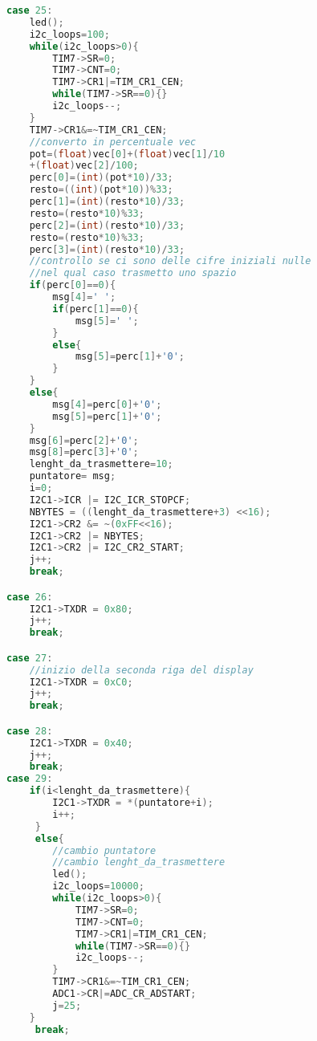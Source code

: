 \documentclass[main.tex]{subfiles}
\begin{document}
\begin{lstlisting}[language=C,caption=Trasmissione messaggio manopola,label={lst:trasm_vec}]
case 25:
	led();
	i2c_loops=100;
	while(i2c_loops>0){
		TIM7->SR=0;
		TIM7->CNT=0;
		TIM7->CR1|=TIM_CR1_CEN;
		while(TIM7->SR==0){}
		i2c_loops--;
	}
	TIM7->CR1&=~TIM_CR1_CEN;
	//converto in percentuale vec
	pot=(float)vec[0]+(float)vec[1]/10
	+(float)vec[2]/100;
	perc[0]=(int)(pot*10)/33;
	resto=((int)(pot*10))%33;
	perc[1]=(int)(resto*10)/33;
	resto=(resto*10)%33;
	perc[2]=(int)(resto*10)/33;
	resto=(resto*10)%33;
	perc[3]=(int)(resto*10)/33;
	//controllo se ci sono delle cifre iniziali nulle
	//nel qual caso trasmetto uno spazio
	if(perc[0]==0){
		msg[4]=' ';
		if(perc[1]==0){
			msg[5]=' ';
		}
		else{
			msg[5]=perc[1]+'0';
		}
	}
	else{
		msg[4]=perc[0]+'0';
		msg[5]=perc[1]+'0';
	}
	msg[6]=perc[2]+'0';
	msg[8]=perc[3]+'0';
	lenght_da_trasmettere=10;
	puntatore= msg;
	i=0;
	I2C1->ICR |= I2C_ICR_STOPCF;
	NBYTES = ((lenght_da_trasmettere+3) <<16);
	I2C1->CR2 &= ~(0xFF<<16);
	I2C1->CR2 |= NBYTES;
	I2C1->CR2 |= I2C_CR2_START;
	j++;
	break; 

case 26:
	I2C1->TXDR = 0x80;
	j++;
	break;

case 27:
    //inizio della seconda riga del display
    I2C1->TXDR = 0xC0;
    j++;
    break;

case 28:
    I2C1->TXDR = 0x40;
    j++;
    break;
case 29: 
    if(i<lenght_da_trasmettere){
        I2C1->TXDR = *(puntatore+i);
    	i++;
     }
     else{
    	//cambio puntatore  
        //cambio lenght_da_trasmettere
    	led();
    	i2c_loops=10000;
        while(i2c_loops>0){
        	TIM7->SR=0;
        	TIM7->CNT=0;
        	TIM7->CR1|=TIM_CR1_CEN;
        	while(TIM7->SR==0){}
        	i2c_loops--;
        }
        TIM7->CR1&=~TIM_CR1_CEN;
        ADC1->CR|=ADC_CR_ADSTART;
        j=25;
    }
     break; 
\end{lstlisting}
\end{document}
